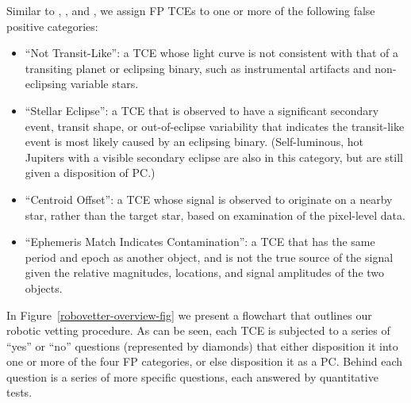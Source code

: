 Similar to \citet{Rowe2015a}, \citep{Mullally2015cat}, and \citet{Coughlin2016}, we assign FP TCEs to one or more of the following false positive categories:


\begin{itemize}
  \item ``Not Transit-Like'': a TCE whose light curve is not consistent with that of a transiting planet or eclipsing binary, such as instrumental artifacts and non-eclipsing variable stars.
  \item ``Stellar Eclipse'': a TCE that is observed to have a significant secondary event, transit shape, or out-of-eclipse variability that indicates the transit-like event is most likely caused by an eclipsing binary. (Self-luminous, hot Jupiters with a visible secondary eclipse are also in this category, but are still given a disposition of PC.)
  \item ``Centroid Offset'': a TCE whose signal is observed to originate on a nearby star, rather than the target star, based on examination of the pixel-level data.
  \item ``Ephemeris Match Indicates Contamination'': a TCE that has the same period and epoch as another object, and is not the true source of the signal given the relative magnitudes, locations, and signal amplitudes of the two objects.
\end{itemize}

\noindent In Figure~\ref{robovetter-overview-fig} we present a flowchart that outlines our robotic vetting procedure. As can be seen, each TCE is subjected to a series of ``yes'' or ``no'' questions (represented by diamonds) that either disposition it into one or more of the four FP categories, or else disposition it as a PC. Behind each question is a series of more specific questions, each answered by quantitative tests. 






